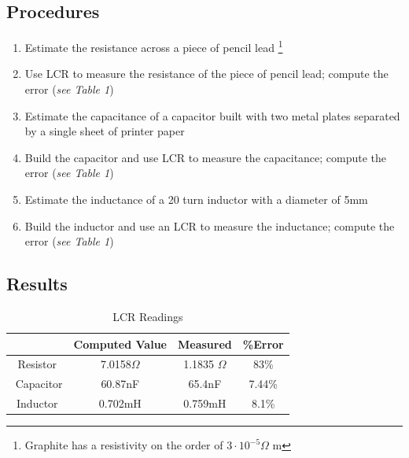 \documentclass[journal, letterpaper]{IEEEtran}
\begin{document}
    \subsection{Procedures}
    	\begin{enumerate}
        	\item Estimate the resistance across a piece of pencil lead \footnote{Graphite has a resistivity on the order of $3\cdot
10^{-5}\Omega$ m}
            \item Use LCR to measure the resistance of the piece of pencil lead; compute the error (\textit{see Table 1})
            \item Estimate the capacitance of a capacitor built with two metal plates separated by a single sheet of printer paper
            \item Build the capacitor and use LCR to measure the capacitance; compute the error (\textit{see Table 1})
            \item Estimate the inductance of a 20 turn inductor with a diameter of 5mm
            \item Build the inductor and use an LCR to measure the inductance; compute the error (\textit{see Table 1})
        \end{enumerate}
    \subsection{Results}
	\begin{table}[!hbt]
		\begin{center}
		\caption{LCR Readings}
		\label{tab:LCRReadings}
		\begin{tabular}{|c|c|c|c|}
			\hline
			 $ $  & Computed Value & Measured & \%Error\\
			\hline
			Resistor & 7.0158$\Omega$ &1.1835 $\Omega$ & 83\%\\
			\hline
\(\)		Capacitor &60.87nF & 65.4nF & 7.44\%\\
			\hline
			Inductor & 0.702mH & 0.759mH & 8.1\%\\
			\hline
		\end{tabular}
		\end{center}
	\end{table}
    
\end{document}
